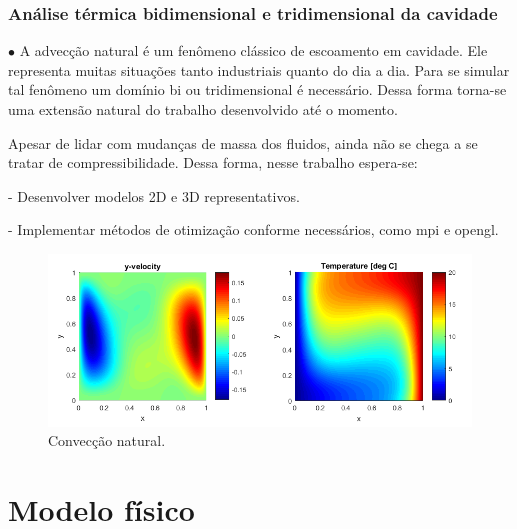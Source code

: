 \documentclass[xcolor=dvipsnames,10pt,aspectratio=169]{beamer}
\begin{document}
	\begin{frame}
		\frametitle{Análise térmica bidimensional e tridimensional da cavidade}
		$\bullet$ A advecção natural é um fenômeno clássico de escoamento em cavidade. Ele representa muitas situações tanto industriais quanto do dia a dia. 
		Para se simular tal fenômeno um domínio bi ou tridimensional é necessário. Dessa forma torna-se uma extensão natural do trabalho desenvolvido até o momento. 
		
		Apesar de lidar com mudanças de massa dos fluidos, ainda não se chega a se tratar de compressibilidade. Dessa forma, nesse trabalho espera-se:

		- Desenvolver modelos 2D e 3D representativos.

		- Implementar métodos de otimização conforme necessários, como mpi e opengl. 

		\begin{figure}[h!]
			\centering
			\includegraphics[trim = {1.7cm 2cm 0 1cm}, clip , angle=0, scale=0.50]{images/NaturalConvectionFromNet}
			\caption{Convecção natural.}
		\end{figure}

	\end{frame}





\section{Modelo físico}
\end{document}
